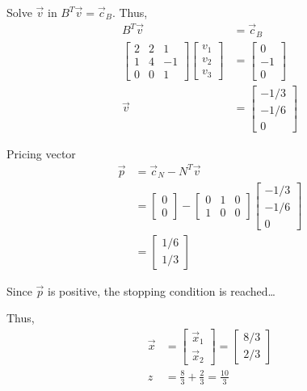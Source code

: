 \documentclass[a4paper,10pt]{article}
\begin{document}
\begin{enumerate}
\begin{enumerate}
{\begin{enumerate}
                    Solve $\vec{v}$ in $B^T\vec{v} = \vec{c}_B$. Thus, 
                    \begin{align}
                        B^T\vec{v} &= \vec{c}_B \\
                        \begin{bmatrix} 2 & 2 & 1 \\ 1 & 4 & -1 \\ 0 & 0 & 1 \end{bmatrix} \begin{bmatrix} v_1 \\ v_2 \\ v_3 \end{bmatrix} &= \begin{bmatrix} 0 \\ -1 \\ 0  \end{bmatrix} \\ 
                        \vec{v} &= \begin{bmatrix} -1/3 \\ -1/6 \\ 0 \end{bmatrix}
                    \end{align}

                    Pricing vector 
                    \begin{align}
                        \vec{p} &= \vec{c}_N - N^T\vec{v} \\
                        &= \begin{bmatrix} 0 \\ 0 \end{bmatrix} - \begin{bmatrix} 0 & 1 & 0 \\ 1 & 0 & 0 \end{bmatrix} \begin{bmatrix} -1/3\\ -1/6 \\ 0 \end{bmatrix} \\
                        &= \begin{bmatrix} 1/6 \\ 1/3 \end{bmatrix}
                    \end{align}

                    Since $\vec{p}$ is positive, the stopping condition is reached\dots

                    Thus, 
                    \begin{align}
                        \vec{x} &= \begin{bmatrix} \vec{x}_ 1 \\ \vec{x}_ 2 \end{bmatrix} = \begin{bmatrix} 8/3 \\ 2/3 \end{bmatrix} \\
                        z &= \frac{8}{3} + \frac{2}{3} = \frac{10}{3}
                    \end{align}


\end{enumerate}}
\end{enumerate}
\end{enumerate}
\end{document}
